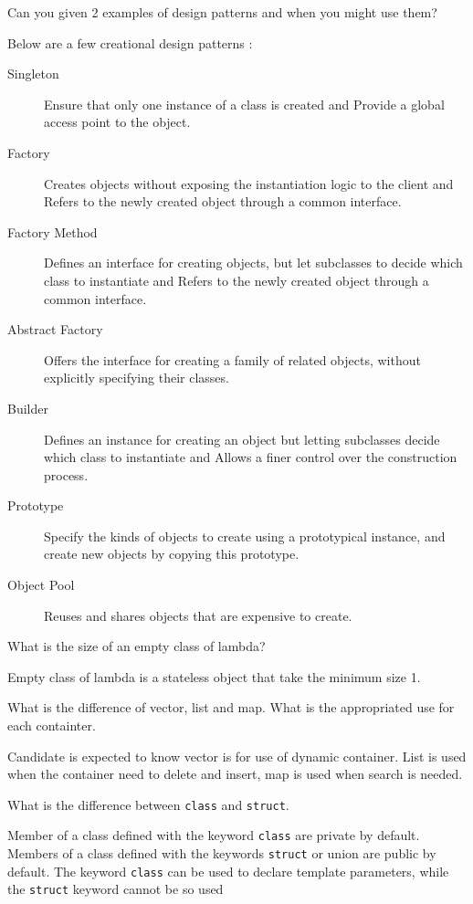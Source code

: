 \documentclass{exam}%
\begin{document}
\begin{questions}
\question Can you given 2 examples of design patterns and when you might use them?
\begin{solution}[.2in]
Below are a few creational design patterns :
\begin{description}
	\item[Singleton] Ensure that only one instance of a class is created and Provide a global access point to the object.
	\item[Factory] Creates objects without exposing the instantiation logic to the client and Refers to the newly created object through a common interface.
	\item[Factory Method] Defines an interface for creating objects, but let subclasses to decide which class to instantiate and Refers to the newly created object through a common interface.
	\item[Abstract Factory] Offers the interface for creating a family of related objects, without explicitly specifying their classes.
	\item[Builder] Defines an instance for creating an object but letting subclasses decide which class to instantiate and Allows a finer control over the construction process.
	\item[Prototype] Specify the kinds of objects to create using a prototypical instance, and create new objects by copying this prototype.
	\item[Object Pool] Reuses and shares objects that are expensive to create.
\end{description}
\end{solution}

\question What is the size of an empty class of lambda?
\begin{solution}[.2in]
Empty class of lambda is a stateless object that take the minimum size 1.
\end{solution}

\question What is the difference of vector, list and map. What is the appropriated use for each containter.
\begin{solution}[.2in]
	Candidate is expected to know vector is for use of dynamic container. List is used when the container need to delete and insert, map is used when search is needed.
\end{solution}

\question What is the difference between \lstinline{class} and \lstinline{struct}.
\begin{solution}[.2in]
	Member of a class defined with the keyword \lstinline{class} are private by default. Members of a class defined with the keywords \lstinline{struct} or union are public by default.
	The keyword \lstinline{class} can be used to declare template parameters, while the \lstinline{struct} keyword cannot be so used
\end{solution}


\end{questions}
\end{document}
